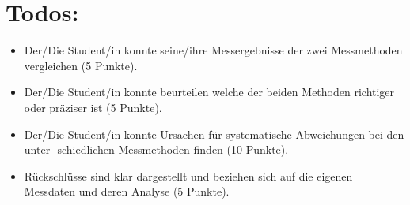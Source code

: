 \documentclass[
  9pt,
]{article}
\providecommand{\tightlist}{%
  \setlength{\itemsep}{0pt}\setlength{\parskip}{0pt}}
\begin{document}
\hypertarget{todos}{%
\section{Todos:}\label{todos}}

\begin{itemize}
\tightlist
\item
  Der/Die Student/in konnte seine/ihre Messergebnisse der zwei
  Messmethoden vergleichen (5 Punkte).
\item
  Der/Die Student/in konnte beurteilen welche der beiden Methoden
  richtiger oder präziser ist (5 Punkte).
\item
  Der/Die Student/in konnte Ursachen für systematische Abweichungen bei
  den unter- schiedlichen Messmethoden finden (10 Punkte).
\item
  Rückschlüsse sind klar dargestellt und beziehen sich auf die eigenen
  Messdaten und deren Analyse (5 Punkte).
\end{itemize}
\end{document}
